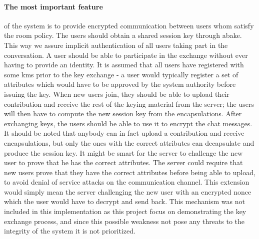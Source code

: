 \paragraph{The most important feature} of the system is to provide encrypted communication between users whom satisfy the room policy. The users should obtain a shared session key through \gls{abake}. This way we assure implicit authentication of all users taking part in the conversation. A user should be able to participate in the exchange without ever having to provide an identity. It is assumed that all users have registered with some \gls{kms} prior to the key exchange - a user would typically register a set of attributes which would have to be approved by the system authority before issuing the key. When new users join, they should be able to upload their contribution and receive the rest of the keying material from the server; the users will then have to compute the new session key from the encapsulations. After exchanging keys, the users should be able to use it to encrypt the chat messages. It should be noted that anybody can in fact upload a contribution and receive encapsulations, but only the ones with the correct attributes can decapsulate and produce the session key. It might be smart for the server to challenge the new user to prove that he has the correct attributes. The server could require that new users prove that they have the correct attributes before being able to upload, to avoid denial of service attacks on the communication channel. This extension would simply mean the server challenging the new user with an encrypted nonce which the user would have to decrypt and send back. This mechanism was not included in this implementation as this project focus on demonstrating the key exchange process, and since this possible weakness not pose any threats to the integrity of the system it is not prioritized. 


